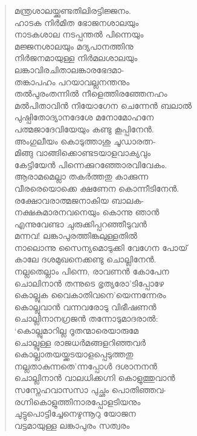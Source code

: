 \begin{verse}
മന്ത്രശാലയ്ക്കുണ്ടതിലിരട്ടിജ്ജനം.\\
ഹാടക നിര്‍മിത ഭോജനശാലയും\\
നാടകശാല നടപ്പന്തല്‍ പിന്നെയും\\
മജ്ജനശാലയും മദ്യപാനത്തിനു\\
നിര്‍ജനമായുള്ള നിര്‍മലശാലയും\\
ലങ്കാവിരചിതാലങ്കാരഭേദമാ-\\
തങ്കാപഹം പറയാവല്ലനന്തനും\\
തല്‍പുരംതന്നില്‍ നീളെത്തിരഞ്ഞേനഹം\\
മല്‍പിതാവിന്‍ നിയോഗേന ചെന്നേന്‍ ബലാല്‍\\
പുഷ്പിതോദ്യാനദേശേ മനോമോഹനേ\\
പത്മജാദേവിയേയും കണ്ടു കൂപ്പിനേന്‍.\\
അംഗുലീയം കൊടുത്താശു ചൂഡാരത്ന-\\
മിങ്ങു വാങ്ങിക്കൊണ്ടടയാളവാക്യവും\\
കേട്ടിയേന്‍ പിന്നെക്കുറഞ്ഞോരവിവേകം.\\
ആരാമമെല്ലാ തകര്‍ത്തതു കാക്കുന്ന\\
വീരരെയൊക്കെ ക്ഷണേന കൊന്നീടിനേന്‍.\\
രക്ഷോവരാത്മജനാകിയ ബാലക-\\
നക്ഷകുമാരനവനെയും കൊന്നു ഞാന്‍\\
എന്നുവേണ്ടാ ചുരുക്കിപ്പറഞ്ഞീടുവന്‍\\
മന്നവ! ലങ്കാപുരത്തിങ്കലുള്ളതില്‍\\
നാലൊന്നു സൈന്യമൊടുക്കി വേഗേന പോയ്\\
കാലേ ദശമുഖനെക്കണ്ടു ചൊല്ലിനേന്‍.\\
നല്ലതെല്ലാം പിന്നെ, രാവണന്‍ കോപേന\\
ചൊലിനാന്‍ തന്നുടെ ഭൃത്യരോ’ടിപ്പോഴേ\\
കൊല്ലുക വൈകാതിവനെ’യെന്നന്നേരം\\
കൊല്ലുവാന്‍ വന്നവരോടു വിഭീഷണന്‍\\
ചൊല്ലിനാനഗ്രജന്‍ തന്നോടുമാദരാല്‍:\\
‘കൊല്ലുമാറില്ല ദൂതന്മാരെയാരുമേ\\
ചൊല്ലുള്ള രാജധര്‍മങ്ങളറിഞ്ഞവര്‍\\
കൊല്ലാതയയ്ക്കടയാളപ്പെടുത്തതു\\
നല്ലതാകുന്നതെ’ന്നപ്പോള്‍ ദശാനനന്‍\\
ചൊല്ലിനാന്‍ വാലധിക്കഗ്നി കൊളുത്തുവാന്‍\\
സസ്നേഹവാസസാ പുച്ഛം പൊതിഞ്ഞവ-\\
രഗ്നികൊളുത്തിനാരപ്പോളടിയനും\\
ചുട്ടുപൊട്ടിച്ചേനെഴുന്നൂറു യോജന\\
വട്ടമായുള്ള ലങ്കാപുരം സത്വരം\\

\end{verse}
